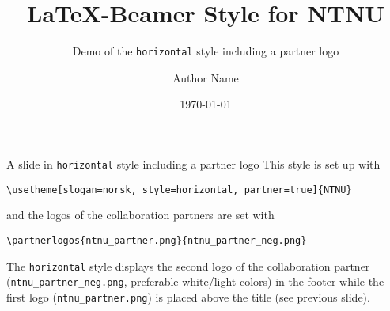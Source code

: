 \documentclass[aspectratio=169]{beamer}
\title{\LaTeX{}-Beamer Style for NTNU}
\subtitle{Demo of the  \texttt{horizontal} style including a partner logo}
\author{Author Name}
\date{\today}
\begin{document}
	\maketitle
	\begin{frame}[fragile]{A slide in \texttt{horizontal} style including a partner logo}
		This style is set up with

		\lstinline!\usetheme[slogan=norsk, style=horizontal, partner=true]{NTNU}!

		and the logos of the collaboration partners are set with

		\lstinline!\partnerlogos{ntnu_partner.png}{ntnu_partner_neg.png}!

		The \texttt{horizontal} style displays the second logo of the
		collaboration partner (\lstinline!ntnu_partner_neg.png!,
		preferable white/light colors) in the footer while the first
		logo (\lstinline!ntnu_partner.png!) is placed above the title
		(see previous slide).
	\end{frame}
\end{document}
